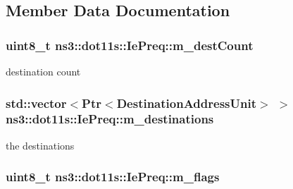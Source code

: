 \subsection{Member Data Documentation}
\subsubsection[{\texorpdfstring{m\+\_\+dest\+Count}{m_destCount}}]{\setlength{\rightskip}{0pt plus 5cm}uint8\+\_\+t ns3\+::dot11s\+::\+Ie\+Preq\+::m\+\_\+dest\+Count\hspace{0.3cm}{\ttfamily [private]}}\hypertarget{classns3_1_1dot11s_1_1IePreq_a086a0d3448eca1d39ada3a2918f2e46e}{}\label{classns3_1_1dot11s_1_1IePreq_a086a0d3448eca1d39ada3a2918f2e46e}


destination count 

\subsubsection[{\texorpdfstring{m\+\_\+destinations}{m_destinations}}]{\setlength{\rightskip}{0pt plus 5cm}std\+::vector$<${\bf Ptr}$<${\bf Destination\+Address\+Unit}$>$ $>$ ns3\+::dot11s\+::\+Ie\+Preq\+::m\+\_\+destinations\hspace{0.3cm}{\ttfamily [private]}}\hypertarget{classns3_1_1dot11s_1_1IePreq_aeea68330e912fe45ce815d6ec0d62c4c}{}\label{classns3_1_1dot11s_1_1IePreq_aeea68330e912fe45ce815d6ec0d62c4c}


the destinations 

\subsubsection[{\texorpdfstring{m\+\_\+flags}{m_flags}}]{\setlength{\rightskip}{0pt plus 5cm}uint8\+\_\+t ns3\+::dot11s\+::\+Ie\+Preq\+::m\+\_\+flags\hspace{0.3cm}{\ttfamily [private]}}\hypertarget{classns3_1_1dot11s_1_1IePreq_aa481740d69cb64893525bc6f0e46f222}{}\label{classns3_1_1dot11s_1_1IePreq_aa481740d69cb64893525bc6f0e46f222}


